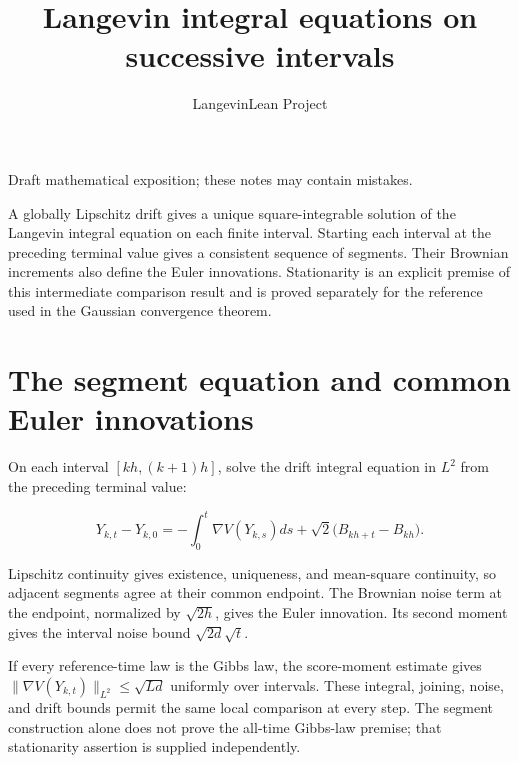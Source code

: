 \documentclass[11pt,a4paper]{article}
\title{\texorpdfstring{Langevin integral equations on successive intervals}{Langevin integral equations on successive intervals}}
\author{LangevinLean Project}
\date{}
\begin{document}
\maketitle
Draft mathematical exposition; these notes may contain mistakes.


A globally Lipschitz drift gives a unique square-integrable solution of the Langevin integral equation on each finite interval. Starting each interval at the preceding terminal value gives a consistent sequence of segments. Their Brownian increments also define the Euler innovations. Stationarity is an explicit premise of this intermediate comparison result and is proved separately for the reference used in the Gaussian convergence theorem.



\section{\texorpdfstring{The segment equation and common Euler innovations}{The segment equation and common Euler innovations}}


On each interval \([kh,(k+1)h]\), solve the drift integral equation in \(L^2\) from the preceding terminal value:

\[Y_{k,t}-Y_{k,0}=-\int_0^t\nabla V(Y_{k,s})ds+\sqrt2\bigl(B_{kh+t}-B_{kh}\bigr).\]

Lipschitz continuity gives existence, uniqueness, and mean-square continuity, so adjacent segments agree at their common endpoint. The Brownian noise term at the endpoint, normalized by \(\sqrt{2h}\), gives the Euler innovation. Its second moment gives the interval noise bound \(\sqrt{2d}\sqrt t\).



If every reference-time law is the Gibbs law, the score-moment estimate gives \(\|\nabla V(Y_{k,t})\|_{L^2}\le\sqrt{Ld}\) uniformly over intervals. These integral, joining, noise, and drift bounds permit the same local comparison at every step. The segment construction alone does not prove the all-time Gibbs-law premise; that stationarity assertion is supplied independently.
\end{document}
